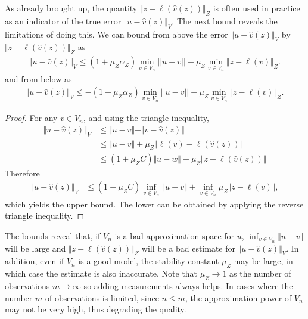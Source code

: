 \documentclass[11pt,a4paper,twoside]{article}
\theoremstyle{definition}
\numberwithin{equation}{section}
\newcommand{\<}{\langle}
\renewcommand{\>}{\rangle}
\begin{document}
As already brought up, the quantity  $\Vert z - \ell(\hat v(z)) \Vert_Z$ is often used in practice as an indicator of the true error $\Vert u - \hat v(z) \Vert_V$. The next bound reveals the limitations of doing this. We can bound from above the error $\Vert u - \hat v(z) \Vert_V$  by $\Vert z - \ell(\hat v(z)) \Vert_Z$ as
\begin{align}
\Vert u - \hat v(z) \Vert_V \leq (1+\mu_Z\alpha_Z) \min_{v\in V_n} || u - v || + \mu_Z \min_{v\in V_n} \Vert z - \ell(v) \Vert_Z.
\end{align}
and from below as
\begin{align}
\Vert u - \hat v(z) \Vert_V \leq -(1+\mu_Z\alpha_Z) \min_{v\in V_n} || u - v || + \mu_Z \min_{v\in V_n} \Vert z - \ell(v) \Vert_Z.
\end{align}
\begin{proof}
For any $v\in V_n$, and using the triangle inequality,
\begin{align}
\Vert u - \hat v(z) \Vert_V
&\leq \Vert u - v \Vert  + \Vert v - \hat v(z) \Vert \\
&\leq \Vert u - v \Vert  + \mu_Z \Vert \ell(v) - \ell(\hat v(z)) \Vert \\
&\leq (1+\mu_Z C)\Vert u - w \Vert  + \mu_Z \Vert z - \ell(\hat v(z)) \Vert
\end{align}
Therefore
\begin{align}
\Vert u - \hat v(z) \Vert_V
&\leq (1+\mu_Z C) \inf_{v\in V_n} \Vert u - v \Vert 
+ \inf_{v\in V_n} \mu_Z \Vert z - \ell(v) \Vert,
\end{align}
which yields the upper bound. The lower can be obtained by applying the reverse triangle inequality.
\end{proof}
The bounds reveal that, if $V_n$ is a bad approximation space for $u$, $\inf_{v\in V_n} \Vert u - v \Vert$ will be large and $\Vert z - \ell(\hat v(z)) \Vert_Z$ will be a bad estimate for $\Vert u - \hat v(z) \Vert_V$. In addition, even if $V_n$ is a good model, the stability constant $\mu_Z$ may be large, in which case the estimate is also inaccurate. Note that $\mu_Z \to 1$ as the number of observations $m\to \infty$ so adding measurements always helps. In cases where the number $m$ of observations is limited, since $n\leq m$, the approximation power of $V_n$ may not be very high, thus degrading the quality.





\end{document}
